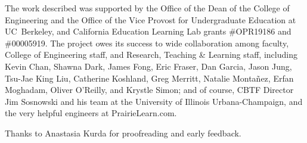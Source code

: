 \begin{acks}

The work described was supported by the Office of the Dean of the College of
Engineering and the Office of the Vice Provost for Undergraduate
Education at UC~Berkeley, and California Education Learning Lab grants \#OPR19186 and \#00005919.
The project owes its success to
wide collaboration among faculty, College of Engineering staff, and Research,
Teaching \& Learning staff, including
Kevin Chan,
Shawna Dark,
James Fong,
Eric Fraser,
Dan Garcia,
Jason Jung,
Tsu-Jae King Liu,
Catherine Koshland,
Greg Merritt,
Natalie Monta\~nez,
Erfan Moghadam,
Oliver O'Reilly,
and Krystle Simon; and of course, CBTF Director Jim Sosnowski and his
team at the University of Illinois Urbana-Champaign, and the very
helpful engineers at PrairieLearn.com.

Thanks to Anastasia Kurda for proofreading and early feedback.
\end{acks}
